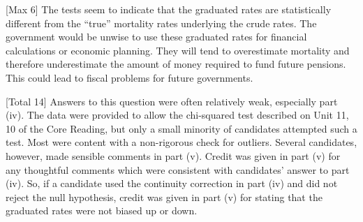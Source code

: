 \documentclass[a4paper,12pt]{article}
\begin{document}
[Max 6]
The tests seem to indicate that the graduated rates are statistically different from the “true” mortality rates underlying the crude rates. 
The government would be unwise to use these graduated rates for financial calculations or economic planning. 
They will tend to overestimate mortality and therefore underestimate the amount of money required to fund future pensions. 
This could lead to fiscal problems for future governments.


\newpage

[Total 14]
Answers to this question were often relatively weak, especially part (iv). The
data were provided to allow the chi-squared test described on Unit 11, %
10 of the Core Reading, but only a small minority of candidates attempted
such a test. Most were content with a non-rigorous check for outliers.
Several candidates, however, made sensible comments in part (v). Credit was given in part (v) for any thoughtful comments which were consistent with candidates’ answer to part (iv). So, if a candidate used the continuity correction in part (iv) and did not reject the null hypothesis, credit was given in part (v) for stating that the graduated rates were not biased up or down.
\end{document}
